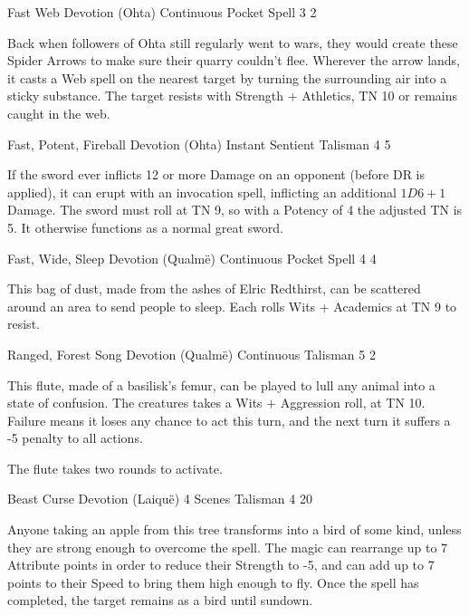 \begin{multicols}{2}
\fi

  {Fast Web}%
  {Devotion (Ohta)}%
  {Continuous}%
  {Pocket Spell}%
  {3}%
  {2}%

\label{spiderarrows}

Back when followers of Ohta still regularly went to wars, they would create these Spider Arrows to make sure their quarry couldn't flee.
Wherever the arrow lands, it casts a Web spell on the nearest target by turning the surrounding air into a sticky substance.
The target resists with Strength + Athletics, TN 10 or remains caught in the web.

  {Fast, Potent, Fireball}%
  {Devotion (Ohta)}%
  {Instant}%
  {Sentient Talisman}%
  {4}%
  {5}%
\label{godslayer}

If the sword ever inflicts 12 or more Damage on an opponent (before DR is applied), it can erupt with an invocation spell, inflicting an additional $1D6 + 1$ Damage.
The sword must roll at TN 9, so with a Potency of 4 the adjusted TN is 5.
It otherwise functions as a normal great sword.

  {Fast, Wide, Sleep}%
  {Devotion (Qualm\"e)}%
  {Continuous}%
  {Pocket Spell}%
  {4}%
  {4}%

This bag of dust, made from the ashes of Elric Redthirst, can be scattered around an area to send people to sleep.
Each rolls Wits + Academics at TN 9 to resist.

  {Ranged, Forest Song}%
  {Devotion (Qualm\"e)}%
  {Continuous}%
  {Talisman}%
  {5}%
  {2}%

This flute, made of a basilisk's femur, can be played to lull any animal into a state of confusion.
The creatures takes a Wits + Aggression roll, at TN 10.
Failure means it loses any chance to act this turn, and the next turn it suffers a -5 penalty to all actions.

The flute takes two rounds to activate.

  {Beast Curse}%
  {Devotion (Laiqu\"{e})}%
  {4 Scenes}%
  {Talisman}%
  {4}%
  {20}%

Anyone taking an apple from this tree transforms into a bird of some kind, unless they are strong enough to overcome the spell.
The magic can rearrange up to 7 Attribute points in order to reduce their Strength to -5, and can add up to 7 points to their Speed to bring them high enough to fly.
Once the spell has completed, the target remains as a bird until sundown.


\end{multicols}
